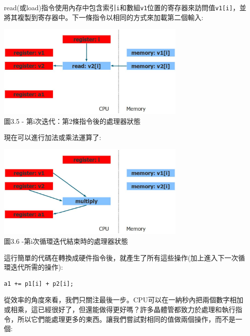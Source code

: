 read(或load)指令使用內存中包含索引\texttt{i}和數組\texttt{v1}位置的寄存器來訪問值\texttt{v1[i]}，並將其複製到寄存器中。下一條指令以相同的方式來加載第二個輸入:

\begin{center}
\includegraphics[width=0.7\textwidth]{content/1/chapter3/images/5.jpg}\\
圖3.5 - 第i次迭代：第2條指令後的處理器狀態
\end{center}

現在可以進行加法或乘法運算了:

\begin{center}
\includegraphics[width=0.7\textwidth]{content/1/chapter3/images/6.jpg}\\
圖3.6 -第i次循環迭代結束時的處理器狀態
\end{center}

這行簡單的代碼在轉換成硬件指令後，就產生了所有這些操作(加上進入下一次循環迭代所需的操作):

\begin{lstlisting}[style=styleCXX]
a1 += p1[i] + p2[i];
\end{lstlisting}

從效率的角度來看，我們只關注最後一步。CPU可以在一納秒內把兩個數字相加或相乘，這已經很好了，但還能做得更好嗎？許多晶體管都致力於處理和執行指令，所以它們能處理更多的東西。讓我們嘗試對相同的值做兩個操作，而不是一個:

